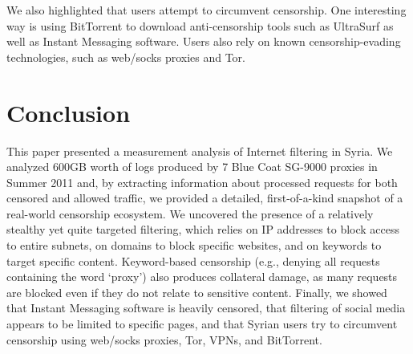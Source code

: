 \documentclass{sig-alternate-2013}
\newcommand{\descr}[1]{\smallskip\noindent{\bf #1}}
\begin{document}
\descr{Censorship Circumvention.} We also highlighted that users attempt to circumvent censorship. One interesting way is using BitTorrent to download anti-censorship tools such as UltraSurf as well as Instant Messaging software. Users also rely on known censorship-evading technologies, such as web/socks proxies and Tor. 





\section{Conclusion}\label{sec:conclusion}

This paper presented a measurement analysis of Internet filtering in Syria.
We analyzed 600GB worth of logs produced by 7 Blue Coat SG-9000 proxies in Summer 2011 and, 
by extracting  information about processed requests for both censored and allowed traffic, we provided a detailed, first-of-a-kind snapshot of a real-world censorship ecosystem. We uncovered the presence of a relatively stealthy yet quite targeted filtering, which relies on IP addresses to block access to entire subnets, on domains to block specific websites, and on keywords to target specific content. 
Keyword-based censorship (e.g., denying all requests containing the word `proxy') also produces  collateral damage, as many requests are blocked even if they do not relate to sensitive content.
Finally, we showed that Instant Messaging software is heavily censored, that filtering of social media appears to be limited to specific pages, and that Syrian users try to circumvent censorship using web/socks proxies, Tor, VPNs, and BitTorrent. 
\end{document}
